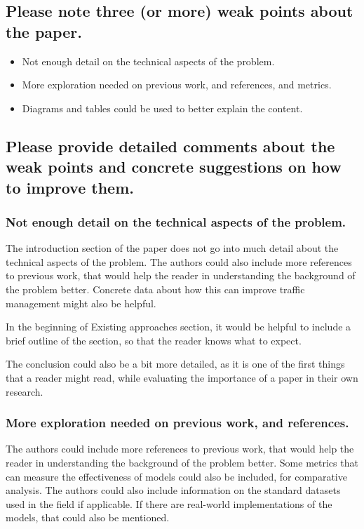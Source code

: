 \documentclass[12pt]{article}
\begin{document}
\subsection*{Please note three (or more) weak points about the paper.}
 \begin{itemize}
    \item Not enough detail on the technical aspects of the problem.
    \item More exploration needed on previous work, and references, and metrics.
    \item Diagrams and tables could be used to better explain the content.
 \end{itemize}


\subsection*{Please provide detailed comments about the weak points and concrete suggestions on how to improve them.}
\subsubsection*{Not enough detail on the technical aspects of the problem.}
The introduction section of the paper does not go into much detail about the technical aspects of the problem. The authors could also include
more references to previous work, that would help the reader in understanding the background of the problem better. Concrete data about how 
this can improve traffic management might also be helpful. 

In the beginning of Existing approaches section, it would be helpful to include a brief outline of the section, so that the reader knows what to expect.

The conclusion could also be a bit more detailed, as it is one of the first things that a reader might read, while evaluating the importance
of a paper in their own research.

\subsubsection*{More exploration needed on previous work, and references.}
The authors could include more references to previous work, that would help the reader in understanding the background of the problem better.
Some metrics that can measure the effectiveness of models could also be included, for comparative analysis. The authors could also include 
information on the standard datasets used in the field if applicable. If there are real-world implementations of the models, that could also be
mentioned.
\end{document}
